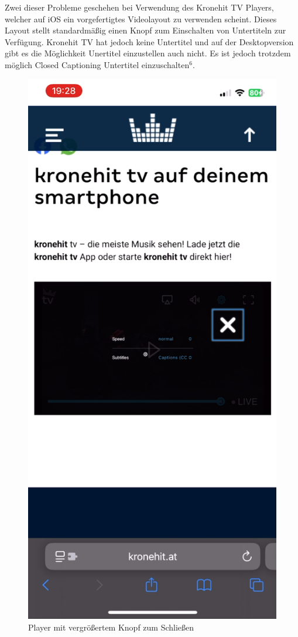 \documentclass{article}
\begin{document}
	Zwei dieser Probleme geschehen bei Verwendung des Kronehit TV Players, welcher auf iOS ein vorgefertigtes Videolayout zu verwenden scheint. Dieses Layout stellt standardmäßig einen Knopf zum Einschalten von Untertiteln zur Verfügung. Kronehit TV hat jedoch keine Untertitel und auf der Desktopversion gibt es die Möglichkeit Unertitel einzustellen auch nicht. Es ist jedoch trotzdem möglich Closed Captioning Untertitel einzuschalten\hyperref[sec:Anhang6]{$^6$}\label{ssub:tvmobile1}.
	\newpage
	\begin{figure}
		\begin{center}
			\includegraphics[scale=0.3]{Bilder/tvmobile.png}
			\caption{Player mit vergrößertem Knopf zum Schließen}
		\end{center}
	\end{figure}
\end{document}
